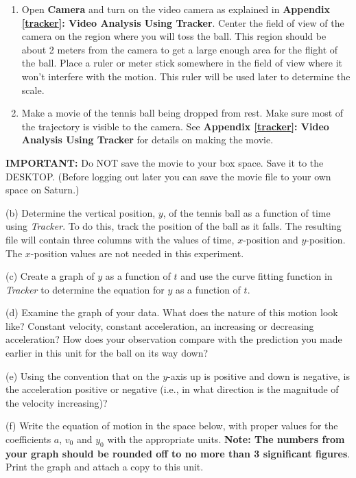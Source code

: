 \begin{enumerate}
\item Open \textbf{Camera} and turn on the video camera as explained in \textbf{Appendix \ref{tracker}: Video Analysis Using Tracker}. Center the field of view of the camera on the region where you will toss the ball. This region should be about 2 meters from the camera to get a large enough area for the flight of the ball. Place a ruler or meter stick somewhere in the field of view where it won't interfere with the motion. This ruler will be used later to determine the scale. 
\item Make a movie of the tennis ball being dropped from rest. Make sure most of the trajectory is visible to the camera. See \textbf{Appendix \ref{tracker}: Video Analysis Using Tracker} for 
details on making the movie.
\end{enumerate}
\textbf{IMPORTANT:} Do NOT save the movie to your box space.  Save it to the DESKTOP.  (Before logging out later you can save the movie file to your own space on Saturn.)
\vspace{10mm}

(b) Determine the vertical position, $y$, of the tennis ball as a function of time using \textit{Tracker}. 
To do this, track the position of the ball as it falls. The resulting file will contain three columns with the values of time, $x$-position and $y$-position. The $x$-position values are not needed in this experiment.
\vspace{10mm}

(c) Create a graph of $y$ as a function of $t$ and use the curve fitting function in \textit{Tracker} to determine the equation for $y$ as a function of $t$.
\vspace{5mm}

\newpage
(d) Examine the graph of your data. What does the nature of this motion look
like? Constant velocity, constant acceleration, an increasing or decreasing
acceleration? How does your observation compare with the prediction you made
earlier in this unit for the ball on its way down?
\vspace{20mm}

(e) Using the convention that on the $y$-axis up is positive and down is negative, is the acceleration positive or negative (i.e., in what direction is the magnitude of the velocity increasing)?
\vspace{20mm}

(f) Write the equation of motion in the space below, with proper values for the coefficients 
$a$, \( v_{0} \) and \( y_{0} \) with the appropriate units. \textbf{Note: The numbers from 
your graph should be rounded off to no more than 3 significant figures}. Print the graph and 
attach a copy to this unit. 

